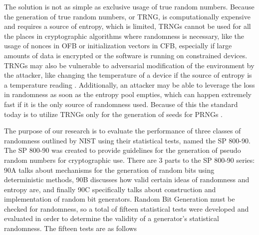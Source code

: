 \documentclass[11pt,letterpaper,conference]{IEEEtran}
\begin{document}
The solution is not as simple as exclusive usage of true random numbers. Because the generation of
true random numbers, or TRNG, is computationally expensive and requires a source of entropy, which
is limited, TRNGs cannot be used for all the places in cryptographic algorithms where randomness is
necessary, like the usage of nonces in OFB or initialization vectors in CFB, especially if large amounts
of data is encrypted or the software is running on constrained devices. TRNGs may also be vulnerable to
adversarial modification of the environment by the attacker, like changing the temperature of a device
if the source of entropy is a temperature reading \cite{barak2003true}. Additionally, an attacker may
be able to leverage the loss in randomness as soon as the entropy pool empties, which can happen extremely
fast if it is the only source of randomness used. Because of this the standard today is to utilize TRNGs
only for the generation of seeds for PRNGs \cite{8276259}.

The purpose of our research is to evaluate the performance of three classes of randomness outlined by NIST
using their statistical tests, named the SP 800-90. The SP 800-90 was created to provide guidelines for
the generation of pseudo random numbers for cryptographic use. There are 3 parts to the SP 800-90 series:
90A talks about mechanisms for the generation of random bits using deterministic methods, 90B
discusses how valid certain ideas of randomness and entropy are, and finally 90C
specifically talks about construction and implementation of random bit generators. Random Bit
Generation must be checked for randomness, so a total of fifteen statistical tests were developed
and evaluated in order to determine the validity of a generator's statistical randomness. The fifteen
tests are as follows
\end{document}
